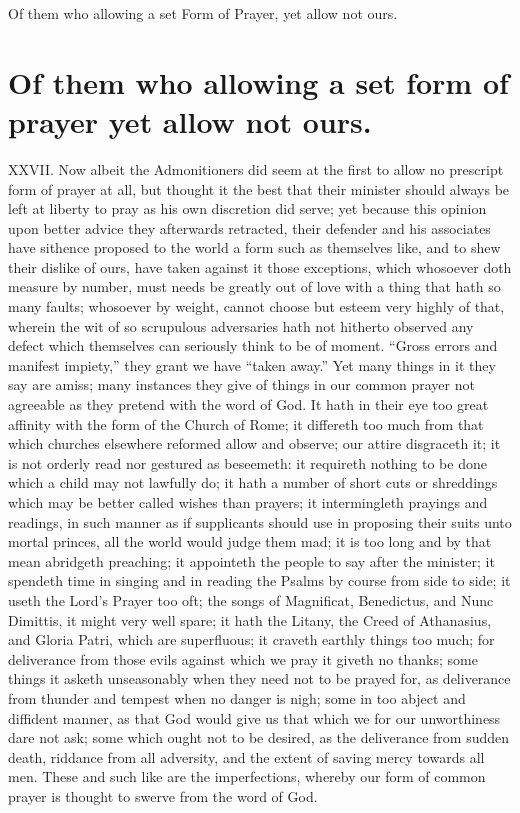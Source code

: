 Of them who allowing a set Form of Prayer, yet allow not ours.
\section*{Of them who allowing a set form of prayer yet allow not ours.}
XXVII. Now albeit the Admonitioners did seem at the first to allow no prescript form of prayer at all, but thought it the best that their minister should always be left at liberty to pray as his own discretion did serve; yet because this opinion upon better advice they afterwards retracted, their defender and his associates have sithence proposed to the world a form such as themselves like, and to shew their dislike of ours, have taken against it those exceptions, which whosoever doth measure by number, must needs be greatly out of love with a thing that hath so many faults; whosoever by weight, cannot choose but esteem very highly of that, wherein the wit of so scrupulous adversaries hath not hitherto observed any defect which themselves can seriously think to be of moment. “Gross errors and manifest impiety,” they  grant we have “taken away.” Yet many things in it they say are amiss; many instances they give of things in our common prayer not agreeable as they pretend with the word of God. It hath in their eye too great affinity with the form of the Church of Rome; it differeth too much from that which churches elsewhere reformed allow and observe; our attire disgraceth it; it is not orderly read nor gestured as beseemeth: it requireth nothing to be done which a child may not lawfully do; it hath a number of short cuts or shreddings which may be better called wishes than prayers; it intermingleth prayings and readings, in such manner as if supplicants should use in proposing their suits unto mortal princes, all the world would judge them mad; it is too long and by that mean abridgeth preaching; it appointeth the people to say after the minister; it spendeth time in singing and in reading the Psalms by course from side to side; it useth the Lord’s Prayer too oft; the songs of Magnificat, Benedictus, and Nunc Dimittis, it might very well spare; it hath the Litany, the Creed of Athanasius, and Gloria Patri, which are superfluous; it craveth earthly things too much; for deliverance from those evils against which we pray it giveth no thanks; some things it asketh unseasonably when they need not to be prayed for, as deliverance from thunder and tempest when no danger is nigh; some in too abject and diffident manner, as that God would give us that which we for our unworthiness dare not ask; some which ought not to be desired, as the deliverance from sudden death, riddance from all adversity, and the extent of saving  mercy towards all men.
 These and such like are the imperfections, whereby our form of common prayer is thought to swerve from the word of God.

